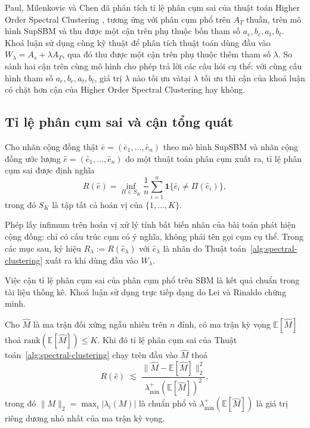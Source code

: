 Paul, Milenkovic và Chen \cite{paul2023hosc} đã phân tích tỉ lệ phân cụm sai của thuật toán Higher Order Spectral Clustering \cite{benson2016}, tương ứng với phân cụm phổ trên $A_T$ thuần, trên mô hình SupSBM và thu được một cận trên phụ thuộc bốn tham số $a_e, b_e, a_t, b_t$. Khoá luận sử dụng cùng kỹ thuật để phân tích thuật toán dùng đầu vào $W_\lambda = A_s + \lambda A_T$, qua đó thu được một cận trên phụ thuộc thêm tham số $\lambda$. So sánh hai cận trên cùng mô hình cho phép trả lời các câu hỏi cụ thể: với cùng cấu hình tham số $a_e, b_e, a_t, b_t$, giá trị $\lambda$ nào tối ưu vàtại $\lambda$ tối ưu thì cận của khoá luận có chặt hơn cận của Higher Order Spectral Clustering hay không.

\subsection{Tỉ lệ phân cụm sai và cận tổng quát}
\label{subsec:misclustering-recipe}

\begin{definition}
\label{def:misclustering}
Cho nhãn cộng đồng thật $\bar e = (\bar e_1, \ldots, \bar e_n)$ theo mô hình SupSBM và nhãn cộng đồng ước lượng $\hat e = (\hat e_1, \ldots, \hat e_n)$ do một thuật toán phân cụm xuất ra, tỉ lệ phân cụm sai được định nghĩa
\[
    R(\hat e) = \inf_{\Pi \in S_K} \frac{1}{n} \sum_{i=1}^n \mathbf{1}\{\bar e_i \neq \Pi(\hat e_i)\},
\]
trong đó $S_K$ là tập tất cả hoán vị của $\{1, \ldots, K\}$.
\end{definition}

Phép lấy infimum trên hoán vị xử lý tính bất biến nhãn của bài toán phát hiện cộng đồng: chỉ có cấu trúc cụm có ý nghĩa, không phải tên gọi cụm cụ thể. Trong các mục sau, ký hiệu $R_\lambda := R(\hat e_\lambda)$ với $\hat e_\lambda$ là nhãn do Thuật toán~\ref{alg:spectral-clustering} xuất ra khi dùng đầu vào $W_\lambda$.

Việc cận tỉ lệ phân cụm sai của phân cụm phổ trên SBM là kết quả chuẩn trong tài liệu thống kê. Khoá luận sử dụng trực tiếp dạng do Lei và Rinaldo chứng minh.

\begin{theorem}
\label{thm:lei-rinaldo}
Cho $\widehat M$ là ma trận đối xứng ngẫu nhiên trên $n$ đỉnh, có ma trận kỳ vọng $\mathbb{E}[\widehat M]$ thoả $\mathrm{rank}(\mathbb{E}[\widehat M]) \leq K$. Khi đó tỉ lệ phân cụm sai của Thuật toán~\ref{alg:spectral-clustering} chạy trên đầu vào $\widehat M$ thoả
\begin{equation}
\label{eq:dk-recipe}
    R(\hat e) \;\lesssim\; \frac{\|\widehat M - \mathbb{E}[\widehat M]\|_2^2}{\lambda_{\min}^+(\mathbb{E}[\widehat M])^2},
\end{equation}
trong đó $\|M\|_2 = \max_i |\lambda_i(M)|$ là chuẩn phổ và $\lambda_{\min}^+(\mathbb{E}[\widehat M])$ là giá trị riêng dương nhỏ nhất của ma trận kỳ vọng.
\end{theorem}

